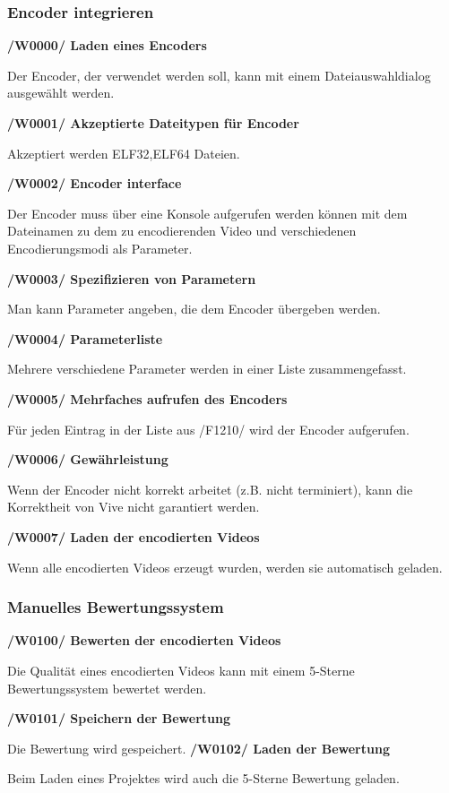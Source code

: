 \documentclass[parskip=full]{scrartcl}
\begin{document}
\subsubsection{Encoder integrieren}
\textbf{/W0000/ Laden eines Encoders}

Der Encoder, der verwendet werden soll, kann mit einem Dateiauswahldialog ausgewählt werden.

\newpage
\textbf{/W0001/ Akzeptierte Dateitypen für Encoder}

Akzeptiert werden ELF32,ELF64 Dateien.

\textbf{/W0002/ Encoder interface}

Der Encoder muss über eine Konsole aufgerufen werden können mit dem Dateinamen zu dem zu encodierenden Video und verschiedenen Encodierungsmodi als Parameter.

\textbf{/W0003/ Spezifizieren von Parametern}

Man kann Parameter angeben, die dem Encoder übergeben werden.

\textbf{/W0004/ Parameterliste}

Mehrere verschiedene Parameter werden in einer Liste zusammengefasst.

\textbf{/W0005/ Mehrfaches aufrufen des Encoders}

Für jeden Eintrag in der Liste aus /F1210/ wird der Encoder aufgerufen.

\textbf{/W0006/ Gewährleistung}

Wenn der Encoder nicht korrekt arbeitet (z.B. nicht terminiert), kann die Korrektheit von Vive nicht garantiert werden.

\textbf{/W0007/ Laden der encodierten Videos}

Wenn alle encodierten Videos erzeugt wurden, werden sie automatisch geladen.

\subsubsection{Manuelles Bewertungssystem}
\textbf{/W0100/ Bewerten der encodierten Videos}

Die Qualität eines encodierten Videos kann mit einem 5-Sterne Bewertungssystem bewertet werden.

\textbf{/W0101/ Speichern der Bewertung}

Die Bewertung wird gespeichert.
\newpage
\textbf{/W0102/ Laden der Bewertung}

Beim Laden eines Projektes wird auch die 5-Sterne Bewertung geladen.
\end{document}
